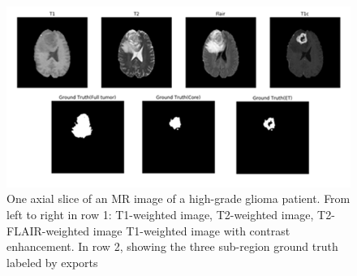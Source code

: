 \begin{figure}[htbp]
      \centering
      \includegraphics[scale=0.43]{Figures/MRI.png}
      \caption[Dataset Overview]{One axial slice of an MR image of a high-grade glioma patient. From left to right in row 1: T1-weighted image, T2-weighted image, T2-FLAIR-weighted image T1-weighted image with contrast enhancement. In row 2, showing the three sub-region ground truth labeled by exports}
      \label{fig:MRI_slice}
 \end{figure}

